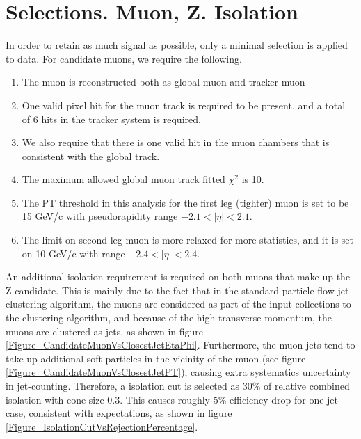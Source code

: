 \documentclass[10pt,a4paper,onecolumn]{article}
\begin{document}
\section{Selections.  Muon, Z.  Isolation}

In order to retain as much signal as possible, only a minimal selection is applied to data.
For candidate muons, we require the following.

\begin{enumerate}
\item The muon is reconstructed both as global muon and tracker muon
\item One valid pixel hit for the muon track is required to be present, and a total of 6 hits in the tracker system is required.
\item We also require that there is one valid hit in the muon chambers that is consistent with the global track.
\item The maximum allowed global muon track fitted $\chi^2$ is 10.
\item The PT threshold in this analysis for the first leg (tighter) muon is set to be 15 GeV/c with pseudorapidity range $-2.1 < |\eta| < 2.1$.
\item The limit on second leg muon is more relaxed for more statistics, and it is set on 10 GeV/c with range $-2.4 < |\eta| < 2.4$.
\end{enumerate}

An additional isolation requirement is required on both muons that make up the Z candidate.
This is mainly due to the fact that in the standard particle-flow jet clustering algorithm, the muons are considered as part
of the input collections to the clustering algorithm, and because of the high transverse momentum, the muons are clustered
as jets, as shown in figure \ref{Figure_CandidateMuonVsClosestJetEtaPhi}.  Furthermore, the muon jets tend to take up additional soft particles
in the vicinity of the muon (see figure \ref{Figure_CandidateMuonVsClosestJetPT}), causing extra systematics uncertainty in jet-counting.
Therefore, a isolation cut is selected as 30\% of relative combined isolation with cone size 0.3.  This causes roughly 5\%
efficiency drop for one-jet case, consistent with expectations, as shown in figure \ref{Figure_IsolationCutVsRejectionPercentage}.
\end{document}
